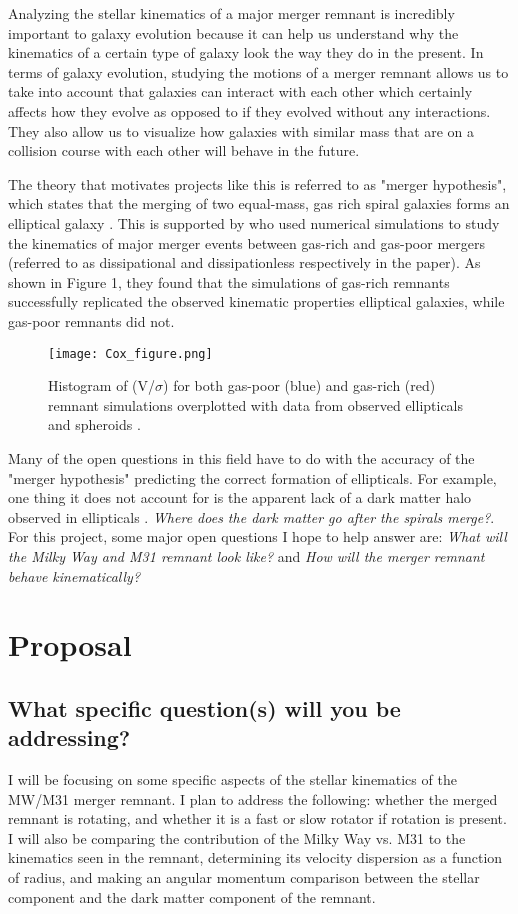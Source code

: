 \documentclass[twocolumn]{aastex63}
\begin{document}
Analyzing the stellar kinematics of a major merger remnant is incredibly important to galaxy evolution because it can help us understand why the kinematics of a certain type of galaxy look the way they do in the present.  In terms of galaxy evolution, studying the motions of a merger remnant allows us to take into account that galaxies can interact with each other which certainly affects how they evolve as opposed to if they evolved without any interactions. They also allow us to visualize how galaxies with similar mass that are on a collision course with each other will behave in the future.   

The theory that motivates projects like this is referred to as "merger hypothesis", which states that the merging of two equal-mass, gas rich spiral galaxies forms an elliptical galaxy \citep{1972ApJ...178..623T}.  This is supported by \cite{2006ApJ...650..791C} who used numerical simulations to study the kinematics of major merger events between gas-rich and gas-poor mergers (referred to as dissipational and dissipationless respectively in the paper).  As shown in Figure 1, they found that the simulations of gas-rich remnants successfully replicated the observed kinematic properties elliptical galaxies, while gas-poor remnants did not. 

\begin{figure}
    \centering
    \texttt{[image: Cox\_figure.png]}
    \caption{Histogram of (V/$\sigma$) for both gas-poor (blue) and gas-rich (red) remnant simulations overplotted with data from observed ellipticals and spheroids \citep{2006ApJ...650..791C}.}
    \label{fig:my_label}
\end{figure}

Many of the open questions in this field have to do with the accuracy of the "merger hypothesis" predicting the correct formation of ellipticals.  For example, one thing it does not account for is the apparent lack of a dark matter halo observed in ellipticals \citep{2003Sci...301.1696R}.  \textit{Where does the dark matter go after the spirals merge?}. For this project, some major open questions I hope to help answer are: \textit{What will the Milky Way and M31 remnant look like?} and \textit{How will the merger remnant behave kinematically?}     

\section{Proposal} \label{sec:style}
\subsection{What specific question(s) will you be addressing?}
I will be focusing on some specific aspects of the stellar kinematics of the MW/M31 merger remnant.  I plan to address the following: whether the merged remnant is rotating, and whether it is a fast or slow rotator if rotation is present.  I will also be comparing the contribution of the Milky Way vs. M31 to the kinematics seen in the remnant, determining its velocity dispersion as a function of radius, and making an angular momentum comparison between the stellar component and the dark matter component of the remnant.       
\end{document}
